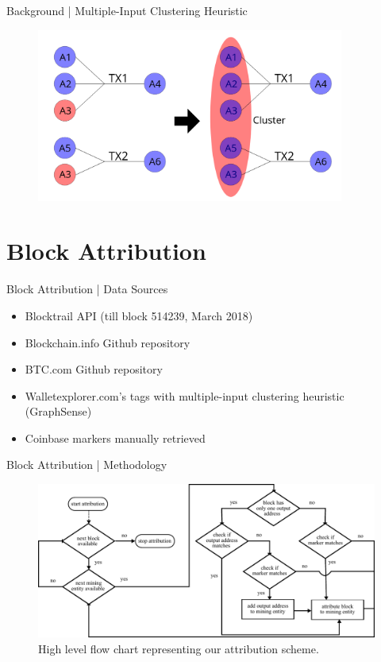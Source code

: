\documentclass[10pt]{beamer}
\begin{document}
\begin{frame}[fragile]{Background | Multiple-Input Clustering Heuristic}
    \begin{figure}
        \centering
        \includegraphics[width=0.9\textwidth]{images/clustering3.png}
    \end{figure}
    \begin{figure}
        \centering
        \def\svgwidth{\columnwidth}
        
    \end{figure}
\end{frame}

\section{Block Attribution} 
\begin{frame}[fragile]{Block Attribution | Data Sources}
    \begin{itemize}
        \item Blocktrail API (till block 514239, March 2018)
        \item Blockchain.info Github repository
        \item BTC.com Github repository
        \item Walletexplorer.com's tags with multiple-input clustering heuristic (GraphSense)
        \item Coinbase markers manually retrieved
    \end{itemize}
\end{frame}

\begin{frame}[fragile]{Block Attribution | Methodology}
    \begin{figure}
        \includegraphics[width=\textwidth]{images/attribution_horizontalized.pdf}
        \caption{High level flow chart representing our attribution scheme.}
        \label{fig:attribution}
    \end{figure}
\end{frame}
\end{document}
